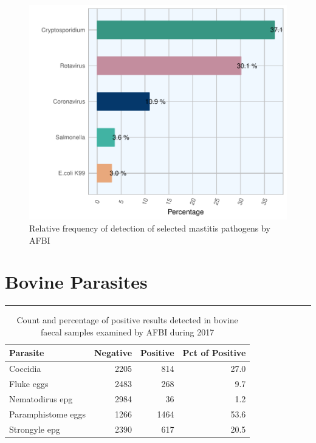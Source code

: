 \documentclass[]{book}
\begin{document}
\begin{figure}

{\centering \includegraphics{AFBI_files/figure-latex/unnamed-chunk-68-1} 

}

\caption{Relative frequency of detection of selected mastitis pathogens by AFBI}\label{fig:unnamed-chunk-68}
\end{figure}

\chapter{Bovine Parasites}\label{bovine-parasites}

\begin{center}\rule{0.5\linewidth}{\linethickness}\end{center}

\begin{table}

\caption{\label{tab:unnamed-chunk-72}Count and percentage of positive results detected in bovine faecal samples examined by AFBI during 2017}
\centering
\begin{tabular}[t]{l|r|r|r}
\hline
Parasite & Negative & Positive & Pct of Positive\\
\hline
Coccidia & 2205 & 814 & 27.0\\
\hline
Fluke eggs & 2483 & 268 & 9.7\\
\hline
Nematodirus epg & 2984 & 36 & 1.2\\
\hline
Paramphistome eggs & 1266 & 1464 & 53.6\\
\hline
Strongyle epg & 2390 & 617 & 20.5\\
\hline
\end{tabular}
\end{table}
\end{document}
